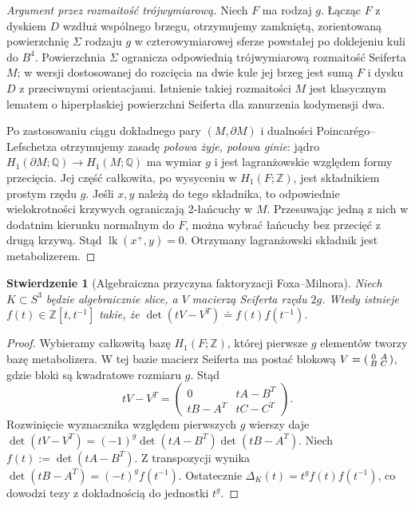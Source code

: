 \documentclass[11pt,a4paper]{report}
\numberwithin{equation}{section}
\theoremstyle{plain}
\newtheorem{stwierdzenie}[twierdzenie]{Stwierdzenie}
\theoremstyle{definition}
\theoremstyle{remark}
\begin{document}
\begin{proof}[Argument przez rozmaitość trójwymiarową]
Niech $F$ ma rodzaj $g$. Łącząc $F$ z dyskiem $D$
wzdłuż wspólnego brzegu, otrzymujemy zamkniętą,
zorientowaną powierzchnię $\Sigma$ rodzaju $g$ w
czterowymiarowej sferze powstałej po doklejeniu kuli
do $B^4$. Powierzchnia $\Sigma$ ogranicza
odpowiednią trójwymiarową rozmaitość Seiferta $M$;
w wersji dostosowanej do rozcięcia na dwie kule jej
brzeg jest sumą $F$ i dysku $D$ z przeciwnymi orientacjami.
Istnienie takiej rozmaitości $M$ jest klasycznym
lematem o hiperpłaskiej powierzchni Seiferta dla
zanurzenia kodymensji dwa.

Po zastosowaniu ciągu dokładnego pary $(M,\partial M)$
i dualności Poincarégo--Lefschetza otrzymujemy zasadę
\emph{połowa żyje, połowa ginie}: jądro
$H_1(\partial M;\mathbb Q)\to H_1(M;\mathbb Q)$
ma wymiar $g$ i jest lagranżowskie względem
formy przecięcia. Jej część całkowita, po wysyceniu
w $H_1(F;\mathbb Z)$, jest składnikiem prostym rzędu $g$.
Jeśli $x,y$ należą do tego składnika, to odpowiednie
wielokrotności krzywych ograniczają 2-łańcuchy w $M$.
Przesuwając jedną z nich w dodatnim kierunku normalnym
do $F$, można wybrać łańcuchy bez przecięć z drugą krzywą.
Stąd $\operatorname{lk}(x^+,y)=0$.
Otrzymany lagranżowski składnik jest metabolizerem.
\end{proof}

\begin{stwierdzenie}[Algebraiczna przyczyna faktoryzacji Foxa--Milnora]
Niech $K\subset S^3$ będzie algebraicznie slice,
a $V$ macierzą Seiferta rzędu $2g$.
Wtedy istnieje $f(t)\in\mathbb Z[t,t^{-1}]$ takie, że
$\det(tV-V^T)\doteq f(t)f(t^{-1})$.
\end{stwierdzenie}

\begin{proof}
Wybieramy całkowitą bazę $H_1(F;\mathbb Z)$,
której pierwsze $g$ elementów tworzy bazę metabolizera.
W tej bazie macierz Seiferta ma postać blokową
$V=\begin{psmallmatrix}0&A\\B&C\end{psmallmatrix}$,
gdzie bloki są kwadratowe rozmiaru $g$.
Stąd
\[
tV-V^T=\begin{pmatrix}
0&tA-B^T\\tB-A^T&tC-C^T
\end{pmatrix}.
\]
Rozwinięcie wyznacznika względem pierwszych $g$ wierszy
daje
$\det(tV-V^T)=(-1)^g\det(tA-B^T)\det(tB-A^T)$.
Niech $f(t):=\det(tA-B^T)$. Z transpozycji wynika
$\det(tB-A^T)=(-t)^g f(t^{-1})$.
Ostatecznie
$\Delta_K(t)=t^g f(t)f(t^{-1})$,
co dowodzi tezy z dokładnością do jednostki $t^g$.
\end{proof}
\end{document}
